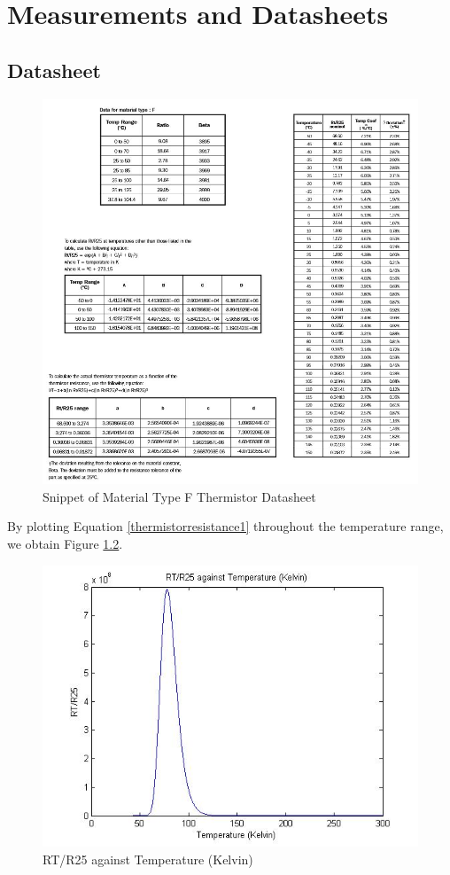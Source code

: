 \chapter{Measurements and Datasheets} 

\section{Datasheet}

\begin{figure}[H]
	\centering
	\includegraphics[width=1.05\linewidth]{thermistordatasheet.jpg}
	\caption{Snippet of Material Type F Thermistor Datasheet \cite{thermistor}}
	\label{thermistordatasheet}
\end{figure}

By plotting Equation \ref{thermistorresistance1} throughout the temperature range, we obtain Figure \ref{RTR25temperature}. 

\begin{figure}[H]
	\centering
	\includegraphics[width=0.8\linewidth]{thermistor4.jpg}
	\caption{RT/R25 against Temperature (Kelvin)}
	\label{RTR25temperature}
\end{figure}